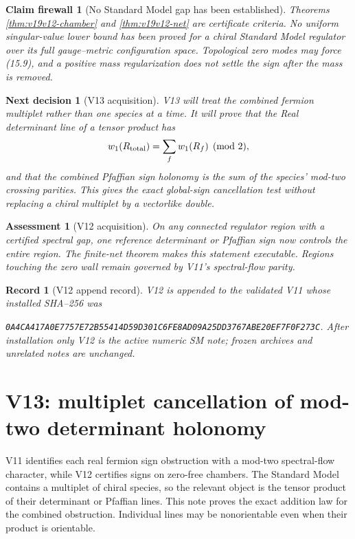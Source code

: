 \documentclass[11pt]{article}
\newtheorem{firewall}[theorem]{Claim firewall}
\newtheorem{decision}[theorem]{Next decision}
\newtheorem{assessment}[theorem]{Assessment}
\newtheorem{record}[theorem]{Record}
\theoremstyle{remark}
\begin{document}
\begin{firewall}[No Standard Model gap has been established]
\label{fire:v19v12}
Theorems \ref{thm:v19v12-chamber} and \ref{thm:v19v12-net} are certificate
criteria.  No uniform singular-value lower bound has been proved for a
chiral Standard Model regulator over its full gauge--metric configuration
space.  Topological zero modes may force (15.9), and a positive mass
regularization does not settle the sign after the mass is removed.
\end{firewall}

\begin{decision}[V13 acquisition]
\label{dec:v19v12-next}
V13 will treat the combined fermion multiplet rather than one species at a
time.  It will prove that the Real determinant line of a tensor product has
\[
 w_1(R_{\rm total})=\sum_f w_1(R_f)\pmod2,
\]
and that the combined Pfaffian sign holonomy is the sum of the species'
mod-two crossing parities.  This gives the exact global-sign cancellation
test without replacing a chiral multiplet by a vectorlike double.
\end{decision}

\begin{assessment}[V12 acquisition]
\label{ass:v19v12}
On any connected regulator region with a certified spectral gap, one
reference determinant or Pfaffian sign now controls the entire region.
The finite-net theorem makes this statement executable.  Regions touching
the zero wall remain governed by V11's spectral-flow parity.
\end{assessment}

\begin{record}[V12 append record]
\label{rec:v19v12}
V12 is appended to the validated V11 whose installed SHA--256 was

\texttt{0A4CA417A0E7757E72B55414D59D301C6FE8AD09A25DD3767ABE20EF7F0F273C}.
After installation only V12 is the active numeric SM note; frozen archives
and unrelated notes are unchanged.
\end{record}





\section{V13: multiplet cancellation of mod-two determinant holonomy}
\label{sec:v19v13}

V11 identifies each real fermion sign obstruction with a mod-two
spectral-flow character, while V12 certifies signs on zero-free chambers.
The Standard Model contains a multiplet of chiral species, so the relevant
object is the tensor product of their determinant or Pfaffian lines.
This note proves the exact addition law for the combined obstruction.
Individual lines may be nonorientable even when their product is
orientable.
\end{document}
